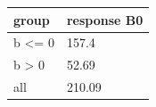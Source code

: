 \begingroup\small
\setlength{\tabcolsep}{3pt}
\renewcommand{\arraystretch}{1.04}
\begin{tabularx}{\linewidth}{XX}
\toprule
group & response B0 \\
\midrule
b \textless{}= 0 & 157.4 \\
b \textgreater{} 0 & 52.69 \\
all & 210.09 \\
\bottomrule
\end{tabularx}
\endgroup

